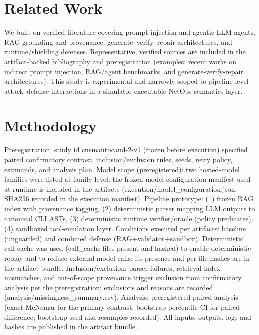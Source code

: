 \documentclass[conference]{IEEEtran}
\begin{document}
\section{Related Work}
We built on verified literature covering prompt injection and agentic LLM agents, RAG grounding and provenance, generate–verify–repair architectures, and runtime/shielding defenses. Representative, verified sources are included in the artifact-backed bibliography and preregistration (examples: recent works on indirect prompt injection, RAG/agent benchmarks, and generate-verify-repair architectures). This study is experimental and narrowly scoped to pipeline-level attack–defense interactions in a simulator-executable NetOps semantics layer.

\section{Methodology}
Preregistration: study id cnsmautocand-2-v1 (frozen before execution) specified paired confirmatory contrast, inclusion/exclusion rules, seeds, retry policy, estimands, and analysis plan. Model scope (preregistered): two hosted-model families were listed at family level; the frozen model-configuration manifest used at runtime is included in the artifacts (execution/model\_configuration.json; SHA256 recorded in the execution manifest). Pipeline prototype: (1) frozen RAG index with provenance tagging, (2) deterministic parser mapping LLM outputs to canonical CLI ASTs, (3) deterministic runtime verifier/oracle (policy predicates), (4) sandboxed tool-emulation layer. Conditions executed per artifacts: baseline (unguarded) and combined defense (RAG+validator+sandbox). Deterministic call-cache was used (call\_cache files present and hashed) to enable deterministic replay and to reduce external model calls; its presence and per-file hashes are in the artifact bundle. Inclusion/exclusion: parser failures, retrieval-index mismatches, and out-of-scope provenance trigger exclusion from confirmatory analysis per the preregistration; exclusions and reasons are recorded (analysis/missingness\_summary.csv). Analysis: preregistered paired analysis (exact McNemar for the primary contrast; bootstrap percentile CI for paired difference; bootstrap seed and resamples recorded). All inputs, outputs, logs and hashes are published in the artifact bundle.
\end{document}
